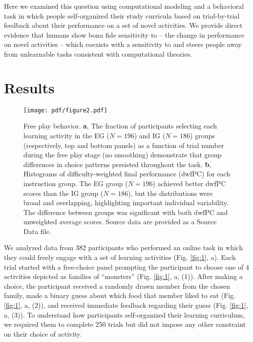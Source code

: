     Here we examined this question using computational modeling and a behavioral task in which people self-organized their study curricula based on trial-by-trial feedback about their performance on a set of novel activities. We provide direct evidence that humans show bona fide sensitivity to {\LP} – the change in performance on novel activities – which coexists with a sensitivity to {\PC} and steers people away from unlearnable tasks consistent with computational theories. 

\section{Results}\label{sec:results}
    
    \begin{figure*}[tb!]
        \center
        \texttt{[image: pdf/figure2.pdf]}
        \caption{Free play behavior. \textbf{a}, The fraction of participants selecting each learning activity in the EG ($N=196$) and IG ($N=186$) groups (respectively, top and bottom panels) as a function of trial number during the free play stage (no smoothing) demonstrate that group differences in choice patterns persisted throughout the task. \textbf{b}, Histograms of difficulty-weighted final performance (dwfPC) for each instruction group. The EG group ($N=196$) achieved better dwfPC scores than the IG group ($N=186$), but the distributions were broad and overlapping, highlighting important individual variability. The difference between groups was significant with both dwfPC and unweighted average {\PC} scores. Source data are provided as a Source Data file.}
        \label{fig:2}
    \end{figure*}
    
    We analyzed data from 382 participants who performed an online task in which they could freely engage with a set of learning activities (Fig. \ref{fig:1}, a). Each trial started with a free-choice panel prompting the participant to choose one of 4 activities depicted as families of “monsters” (Fig. \ref{fig:1}, a, (1)). After making a choice, the participant received a randomly drawn member from the chosen family, made a binary guess about which food that member liked to eat (Fig. \ref{fig:1}, a, (2)), and received immediate feedback regarding their guess (Fig. \ref{fig:1}, a, (3)). To understand how participants self-organized their learning curriculum, we required them to complete 250 trials but did not impose any other constraint on their choice of activity.

